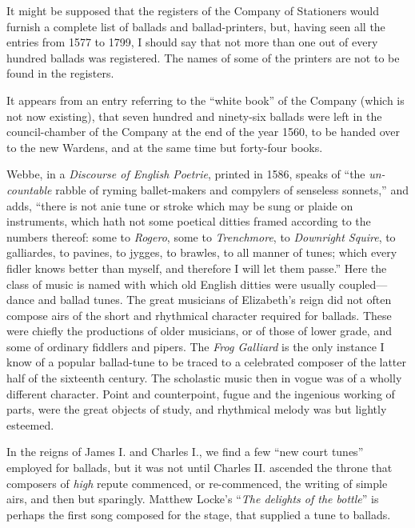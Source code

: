 \renewcommand\versoheader{introduction.}
\renewcommand\rectoheader{introduction.}

It might be supposed that the registers of the Company of Stationers would 
furnish a complete list of ballads and ballad-printers, but, having seen all the
entries from 1577 to 1799, I should say that not more than one out of every
hundred ballads was registered. The names of some of the printers are not to
be found in the registers.

It appears from an entry referring to the “white book” of the Company
(which is not now existing), that seven hundred and ninety-six ballads were left
in the council-chamber of the Company at the end of the year 1560, to be handed
over to the new Wardens, and at the same time but forty-four books.

Webbe, in a \textit{Discourse of English Poetrie}, printed in 1586, speaks of “the
\textit{un-countable} rabble of ryming ballet-makers and compylers of senseless sonnets,”
and adds, “there is not anie tune or stroke which may be sung or plaide on
instruments, which hath not some poetical ditties framed according to the numbers
thereof: some to \textit{Rogero}, some to \textit{Trenchmore}, to \textit{Downright Squire}, to galliardes,
to pavines, to jygges, to brawles, to all manner of tunes; which every fidler knows
better than myself, and therefore I will let them passe.” Here the class of music
is named with which old English ditties were usually coupled—dance and ballad
tunes. The great musicians of Elizabeth’s reign did not often compose airs of
the short and rhythmical character required for ballads. These were chiefly the
productions of older musicians, or of those of lower grade, and some of ordinary
fiddlers and pipers. The \textit{Frog Galliard} is the only instance I know of a popular
ballad-tune to be traced to a celebrated composer of the latter half of the sixteenth
century. The scholastic music then in vogue was of a wholly different character.
Point and counterpoint, fugue and the ingenious working of parts, were the great
objects of study, and rhythmical melody was but lightly esteemed.

In the reigns of James I. and Charles I., we find a few “new court tunes”
employed for ballads, but it was not until Charles II. ascended the throne that
composers of \textit{high} repute commenced, or re-commenced, the writing of simple
airs, and then but sparingly. Matthew Locke’s “\textit{The delights of the bottle}” is
perhaps the first song composed for the stage, that supplied a tune to ballads.

